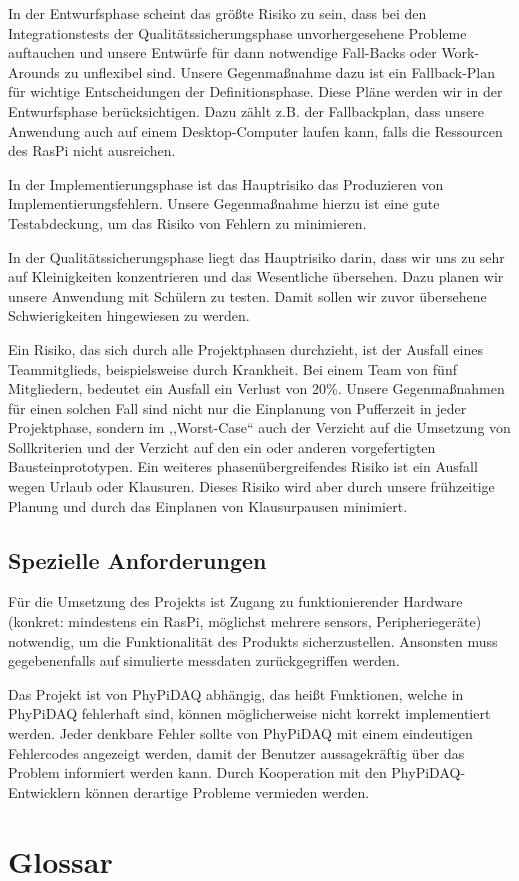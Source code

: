 \documentclass[parskip=full]{scrartcl}
\begin{document}
In der Entwurfsphase scheint das größte Risiko zu sein, dass bei den Integrationstests der Qualitätssicherungsphase unvorhergesehene Probleme auftauchen und unsere Entwürfe für dann notwendige Fall-Backs oder Work-Arounds zu unflexibel sind. Unsere Gegenmaßnahme dazu ist ein Fallback-Plan für wichtige Entscheidungen der Definitionsphase. Diese Pläne werden wir in der Entwurfsphase berücksichtigen. Dazu zählt z.B. der Fallbackplan, dass unsere Anwendung auch auf einem Desktop-Computer laufen kann, falls die Ressourcen des \gls{RasPi} nicht ausreichen.
 
In der Implementierungsphase ist das Hauptrisiko das Produzieren von Implementierungsfehlern. Unsere Gegenmaßnahme hierzu ist eine gute Testabdeckung, um das Risiko von Fehlern zu minimieren.
 
In der Qualitätssicherungsphase liegt das Hauptrisiko darin, dass wir uns zu sehr auf Kleinigkeiten konzentrieren und das Wesentliche 
übersehen. Dazu planen wir unsere Anwendung mit Schülern zu testen. Damit sollen wir zuvor übersehene Schwierigkeiten hingewiesen zu werden.

Ein Risiko, das sich durch alle Projektphasen durchzieht, ist der Ausfall eines Teammitglieds, beispielsweise durch Krankheit. Bei einem Team von fünf Mitgliedern, bedeutet ein Ausfall ein Verlust von 20\%. Unsere Gegenmaßnahmen für einen solchen Fall sind nicht nur die Einplanung von Pufferzeit in jeder Projektphase, sondern im ,,Worst-Case`` auch der Verzicht auf die Umsetzung von Sollkriterien und der Verzicht auf den ein oder anderen vorgefertigten Bausteinprototypen. Ein weiteres phasenübergreifendes Risiko ist ein Ausfall wegen Urlaub oder Klausuren. Dieses Risiko wird aber durch unsere frühzeitige Planung und durch das Einplanen von Klausurpausen minimiert.

\subsection{Spezielle Anforderungen}\label{entwicklungsumgebung}

Für die Umsetzung des Projekts ist Zugang zu funktionierender Hardware (konkret: mindestens ein \gls{RasPi}, möglichst mehrere \glspl{sensor}, Peripheriegeräte) notwendig, um die Funktionalität des Produkts sicherzustellen.\newline
Ansonsten muss gegebenenfalls auf simulierte \gls{messdaten} zurückgegriffen werden.

Das Projekt ist von \gls{PhyPiDAQ} abhängig, das heißt Funktionen, welche in PhyPiDAQ fehlerhaft sind, können möglicherweise nicht korrekt implementiert werden. Jeder denkbare Fehler sollte von PhyPiDAQ mit einem eindeutigen Fehlercodes angezeigt werden, damit der Benutzer aussagekräftig über das Problem informiert werden kann.\newline
Durch Kooperation mit den PhyPiDAQ-Entwicklern können derartige Probleme vermieden werden.

\clearpage
\section{Glossar}\label{glossar}

\renewcommand*{\glossarysection}[2][]{}	%
\printnoidxglossaries				%
\end{document}
